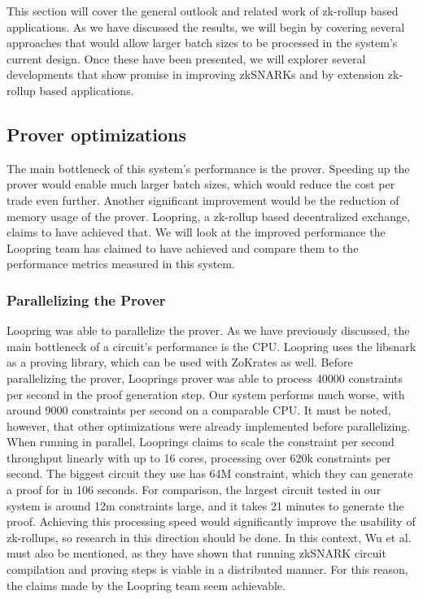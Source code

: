 \documentclass[../../thesis.tex]{subfiles}
\begin{document}
This section will cover the general outlook and related work of zk-rollup based applications. As we have discussed the results, we will begin by covering several approaches that would allow larger batch sizes to be processed in the system's current design. Once these have been presented, we will explorer several developments that show promise in improving zkSNARKs and by extension zk-rollup based applications. 

\subsection{Prover optimizations}
The main bottleneck of this system's performance is the prover. Speeding up the prover would enable much larger batch sizes, which would reduce the cost per trade even further. Another significant improvement would be the reduction of memory usage of the prover. Loopring, a zk-rollup based decentralized exchange, claims to have achieved that. We will look at the improved performance the Loopring team has claimed to have achieved \cite{loopring_2020} and compare them to the performance metrics measured in this system.

\subsubsection{Parallelizing the Prover} \label{para_loopring}
Loopring was able to parallelize the prover. As we have previously discussed, the main bottleneck of a circuit's performance is the CPU. Loopring uses the libsnark as a proving library, which can be used with ZoKrates as well. Before parallelizing the prover, Looprings prover was able to process 40000 constraints per second in the proof generation step. Our system performs much worse, with around 9000 constraints per second on a comparable CPU. It must be noted, however, that other optimizations were already implemented before parallelizing. When running in parallel, Looprings claims to scale the constraint per second throughput linearly with up to 16 cores, processing over 620k constraints per second. The biggest circuit they use has 64M constraint, which they can generate a proof for in 106 seconds. For comparison, the largest circuit tested in our system is around 12m constraints large, and it takes 21 minutes to generate the proof. Achieving this processing speed would significantly improve the usability of zk-rollups, so research in this direction should be done. In this context, Wu et al. \cite{wu2018dizk} must also be mentioned, as they have shown that running zkSNARK circuit compilation and proving steps is viable in a distributed manner. For this reason, the claims made by the Loopring team seem achievable. 
\end{document}
